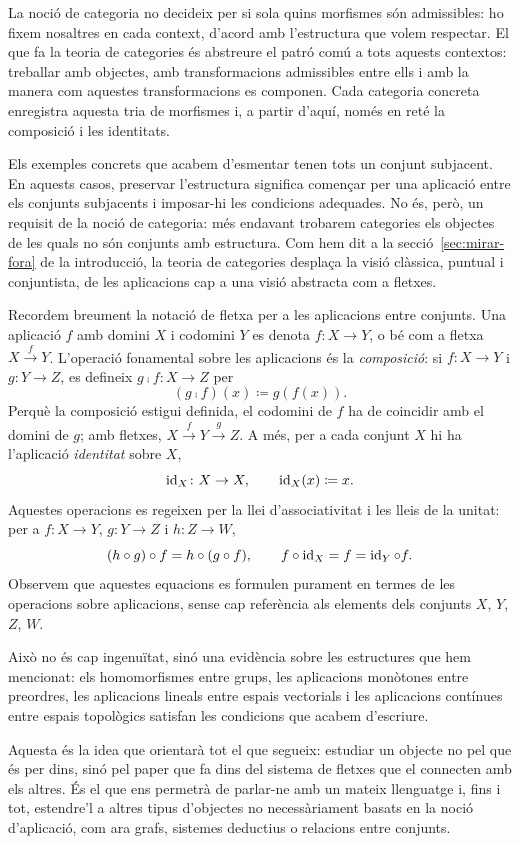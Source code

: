 La noció de categoria no decideix per si sola quins morfismes són admissibles: ho fixem nosaltres en cada context, d'acord amb l'estructura que volem respectar. El que fa la teoria de categories és abstreure el patró comú a tots aquests contextos: treballar amb objectes, amb transformacions admissibles entre ells i amb la manera com aquestes transformacions es componen. Cada categoria concreta enregistra aquesta tria de morfismes i, a partir d'aquí, només en reté la composició i les identitats.

Els exemples concrets que acabem d'esmentar tenen tots un conjunt subjacent. En aquests casos, preservar l'estructura significa començar per una aplicació entre els conjunts subjacents i imposar-hi les condicions adequades. No és, però, un requisit de la noció de categoria: més endavant trobarem categories els objectes de les quals no són conjunts amb estructura. Com hem dit a la secció~\ref{sec:mirar-fora} de la introducció, la teoria de categories desplaça la visió clàssica, puntual i conjuntista, de les aplicacions cap a una visió abstracta com a fletxes.

Recordem breument la notació de fletxa per a les aplicacions entre conjunts. Una aplicació $f$ amb domini $X$ i codomini $Y$ es denota $f\colon X\to Y$, o bé com a fletxa $X\xrightarrow{f}Y$. L'operació fonamental sobre les aplicacions és la \emph{composició}: si $f\colon X\to Y$ i $g\colon Y\to Z$, es defineix $g\comp f\colon X\to Z$ per
\[
(g\comp f)(x)\coloneqq g(f(x)).
\]
Perquè la composició estigui definida, el codomini de $f$ ha de coincidir amb el domini de $g$; amb fletxes, $X\xrightarrow{f}Y\xrightarrow{g}Z$. A més, per a cada conjunt $X$ hi ha l'aplicació \emph{identitat} sobre $X$,
\[
\operatorname{id}_X\colon X\to X,\qquad \operatorname{id}_X(x)\coloneqq x.
\]
Aquestes operacions es regeixen per la llei d'associativitat i les lleis de la unitat: per a $f\colon X\to Y$, $g\colon Y\to Z$ i $h\colon Z\to W$,
\[
(h\circ g)\circ f=h\circ(g\circ f),\qquad f\circ\operatorname{id}_X=f=\operatorname{id}_Y\circ f.
\]
Observem que aquestes equacions es formulen purament en termes de les operacions sobre aplicacions, sense cap referència als elements dels conjunts $X$, $Y$, $Z$, $W$.

Això no és cap ingenuïtat, sinó una evidència sobre les estructures que hem mencionat: els homomorfismes entre grups, les aplicacions monòtones entre preordres, les aplicacions lineals entre espais vectorials i les aplicacions contínues entre espais topològics satisfan les condicions que acabem d'escriure.

Aquesta és la idea que orientarà tot el que segueix: estudiar un objecte no pel que és per dins, sinó pel paper que fa dins del sistema de fletxes que el connecten amb els altres. És el que ens permetrà de parlar-ne amb un mateix llenguatge i, fins i tot, estendre'l a altres tipus d'objectes no necessàriament basats en la noció d'aplicació, com ara grafs, sistemes deductius o relacions entre conjunts.

